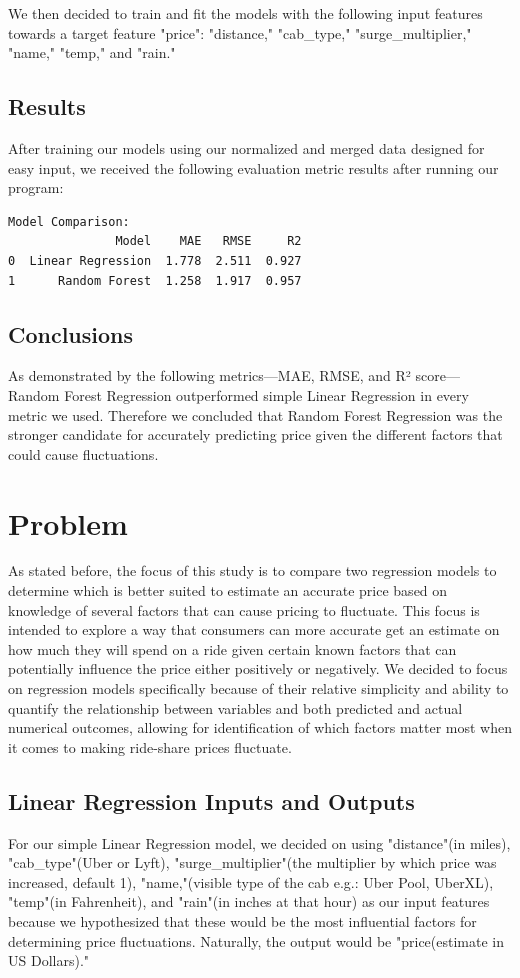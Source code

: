 \documentclass[conference]{IEEEtran}
\begin{document}
We then decided to train and fit the models with the following input features towards a target feature "price": "distance," "cab\_type," "surge\_multiplier," "name," "temp," and "rain."

\subsection{Results}
After training our models using our normalized and merged data designed for easy input, we received the following evaluation metric results after running our program:
\begin{center}
\begin{verbatim}
Model Comparison:
               Model    MAE   RMSE     R2
0  Linear Regression  1.778  2.511  0.927
1      Random Forest  1.258  1.917  0.957
\end{verbatim}
\end{center}

\subsection{Conclusions}
As demonstrated by the following metrics—MAE, RMSE, and R² score— Random Forest Regression outperformed simple Linear Regression in every metric we used. Therefore we concluded that Random Forest Regression was the stronger candidate for accurately predicting price given the different factors that could cause fluctuations.

\section{Problem}
As stated before, the focus of this study is to compare two regression models to determine which is better suited to estimate an accurate price based on knowledge of several factors that can cause pricing to fluctuate. This focus is intended to explore a way that consumers can more accurate get an estimate on how much they will spend on a ride given certain known factors that can potentially influence the price either positively or negatively. We decided to focus on regression models specifically because of their relative simplicity and ability to quantify the relationship between variables and both predicted and actual numerical outcomes, allowing for identification of which factors matter most when it comes to making ride-share prices fluctuate.

\subsection{Linear Regression Inputs and Outputs}
For our simple Linear Regression model, we decided on using "distance"(in miles), "cab\_type"(Uber or Lyft), "surge\_multiplier"(the multiplier by which price was increased, default 1), "name,"(visible type of the cab e.g.: Uber Pool, UberXL), "temp"(in Fahrenheit), and "rain"(in inches at that hour) as our input features because we hypothesized that these would be the most influential factors for determining price fluctuations. Naturally, the output would be "price(estimate in US Dollars)."
\end{document}
